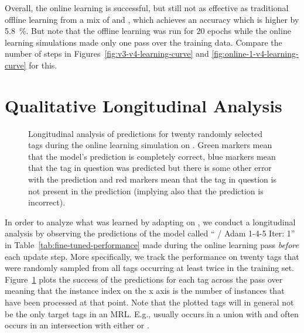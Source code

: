 Overall, the online learning is successful, but still not as effective as
traditional offline learning from a mix of \nlmthree{} and \nlmfour{}, which
achieves an accuracy which is higher by \SI{5.8}{\%}. But note that the offline
learning was run for \num{20} epochs while the online learning simulations made
only one pass over the training data. Compare the number of steps in
Figures~\ref{fig:v3-v4-learning-curve} and \ref{fig:online-1-v4-learning-curve}
for this.

\FloatBarrier
\section{Qualitative Longitudinal Analysis}

\begin{figure}[h]
  \centering
  \resizebox{\textwidth}{!}{}
  \caption[Longitudinal analysis]{Longitudinal analysis of predictions for
    twenty randomly selected tags during the online learning simulation on
    \nlmfour{}. \textcolor{mplGreen}{Green markers} mean that the model’s
    prediction is completely correct, \textcolor{mplBlue}{blue markers} mean
    that the tag in question was predicted but there is some other error with
    the prediction and \textcolor{mplRed}{red markers} mean that the tag in
    question is not present in the prediction (implying also that the prediction
    is incorrect).}
  \label{fig:online-analysis}
\end{figure}

In order to analyze what was learned by adapting on \nlmfour{}, we conduct a
longitudinal analysis by observing the predictions of the model called
\enquote{\nlmthree{} \textrightarrow{} \nlmthree{}/\nlmfour{} Adam 1-4-5 Iter:
  1} in Table~\ref{tab:fine-tuned-performance} made during the online learning
pass \emph{before} each update step. More specifically, we track the performance
on twenty tags that were randomly sampled from all tags occurring at least twice
in the \nlmfour{} training set. Figure~\ref{fig:online-analysis} plots the
success of the predictions for each tag across the pass over \nlmfour{} meaning
that the instance index on the x axis is the number of instances that have been
processed at that point. Note that the plotted tags will in general not be the
only target tags in an MRL. E.g.,  usually occurs
in a union with  and  often occurs
in an intersection with either  or
.

